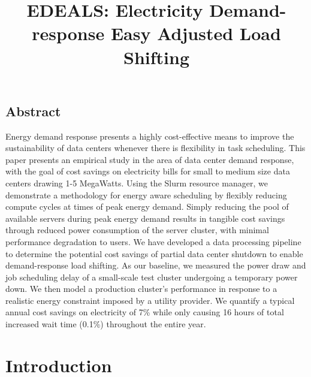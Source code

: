 \documentclass[letterpaper,twocolumn,10pt]{article}
\begin{document}
\date{}

\title{\Large \bf EDEALS:  Electricity Demand-response Easy Adjusted Load Shifting  }


\maketitle



\subsection*{Abstract}
Energy demand response presents a highly cost-effective means to improve the sustainability of data centers whenever there is flexibility in task scheduling.  This paper presents an empirical study in the area of data center demand response, with the goal of cost savings on electricity bills for small to medium size data centers drawing 1-5 MegaWatts. Using the Slurm resource manager, we demonstrate a methodology for energy aware scheduling by flexibly reducing compute cycles at times of peak energy demand.  Simply reducing the pool of available servers during peak energy demand results in tangible cost savings through reduced power consumption of the server cluster, with minimal performance degradation to users. We have developed a data processing pipeline to determine the potential cost savings of partial data center shutdown to enable demand-response load shifting. As our baseline, we measured the power draw and job scheduling delay of a small-scale test cluster undergoing a temporary power down. We then model a production cluster's performance in response to a realistic energy constraint imposed by a utility provider.  We quantify a typical annual cost savings on electricity of 7\% while only causing 16 hours of total increased wait time (0.1\%) throughout the entire year.


\section{Introduction}
\end{document}
